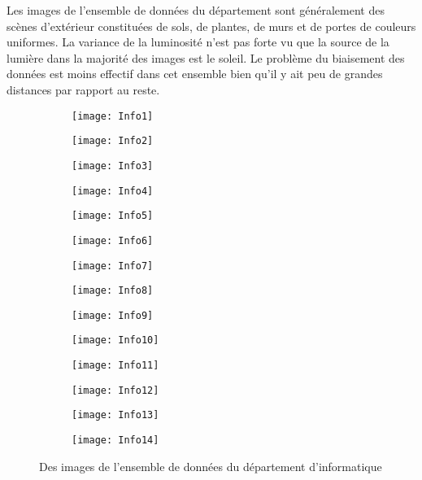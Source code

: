 Les images de l'ensemble de données du département sont généralement des scènes
d'extérieur constituées de sols, de plantes, de murs et de portes de couleurs uniformes.
La variance de la luminosité n'est pas forte vu que la source de la lumière dans
la majorité des images est le soleil. Le problème du biaisement des données est
moins effectif dans cet ensemble bien qu'il y ait peu de grandes distances par rapport
au reste.

\bigskip

\begin{figure}[h]
\centering
\begin{subfigure}{0.125\textwidth}\texttt{[image: Info1]}\end{subfigure}
\begin{subfigure}{0.125\textwidth}\texttt{[image: Info2]}\end{subfigure}
\begin{subfigure}{0.125\textwidth}\texttt{[image: Info3]}\end{subfigure}
\begin{subfigure}{0.125\textwidth}\texttt{[image: Info4]}\end{subfigure}
\begin{subfigure}{0.125\textwidth}\texttt{[image: Info5]}\end{subfigure}
\begin{subfigure}{0.125\textwidth}\texttt{[image: Info6]}\end{subfigure}
\begin{subfigure}{0.125\textwidth}\texttt{[image: Info7]}\end{subfigure}
\begin{subfigure}{0.125\textwidth}\texttt{[image: Info8]}\end{subfigure}
\begin{subfigure}{0.125\textwidth}\texttt{[image: Info9]}\end{subfigure}
\begin{subfigure}{0.125\textwidth}\texttt{[image: Info10]}\end{subfigure}
\begin{subfigure}{0.125\textwidth}\texttt{[image: Info11]}\end{subfigure}
\begin{subfigure}{0.125\textwidth}\texttt{[image: Info12]}\end{subfigure}
\begin{subfigure}{0.125\textwidth}\texttt{[image: Info13]}\end{subfigure}
\begin{subfigure}{0.125\textwidth}\texttt{[image: Info14]}\end{subfigure}
\caption{Des images de l'ensemble de données du département d'informatique}
\end{figure}

